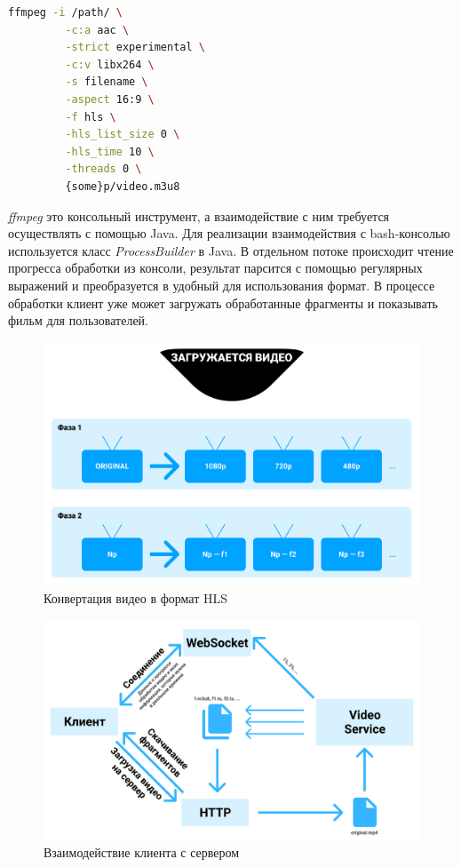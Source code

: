\documentclass{../includes/TechDoc}
\begin{document}
    \begin{lstlisting}[language=bash,caption={Пример команды ffmpeg для генерации файла в формате HLS}]
    ffmpeg -i /path/ \
         -c:a aac \
         -strict experimental \
         -c:v libx264 \
         -s filename \
         -aspect 16:9 \
         -f hls \
         -hls_list_size 0 \
         -hls_time 10 \
         -threads 0 \
         {some}p/video.m3u8
    \end{lstlisting}

    \emph{ffmpeg} это консольный инструмент, а взаимодействие с ним требуется осуществлять с помощью Java.
    Для реализации взаимодействия с bash-консолью используется класс \emph{ProcessBuilder} в Java.
    В отдельном потоке происходит чтение прогресса обработки из консоли, результат парсится с помощью регулярных выражений и преобразуется в удобный для использования формат.
    В процессе обработки клиент уже может загружать обработанные фрагменты и показывать фильм для пользователей.

    \begin{figure}[h]
        \centering
        \includegraphics[width=1\linewidth]{images/server_converting.png}
        \caption{Конвертация видео в формат HLS}
        \label{fig:server_converting}
    \end{figure}

    \begin{figure}[h]
        \centering
        \includegraphics[width=1\linewidth]{images/video_upload.png}
        \caption{Взаимодействие клиента с сервером}
        \label{fig:video_upload}
    \end{figure}
\end{document}
